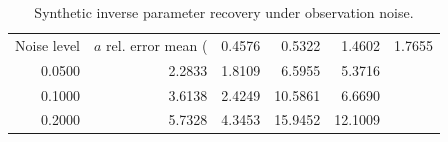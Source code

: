 \begin{table}
\caption{Synthetic inverse parameter recovery under observation noise.}
\label{tab:synthetic_inverse_recovery}
\begin{tabular}{rrrrr}
\toprule
Noise level & $a$ rel. error mean (%
 & 0.4576 & 0.5322 & 1.4602 & 1.7655 \\
0.0500 & 2.2833 & 1.8109 & 6.5955 & 5.3716 \\
0.1000 & 3.6138 & 2.4249 & 10.5861 & 6.6690 \\
0.2000 & 5.7328 & 4.3453 & 15.9452 & 12.1009 \\
\bottomrule
\end{tabular}
\end{table}
